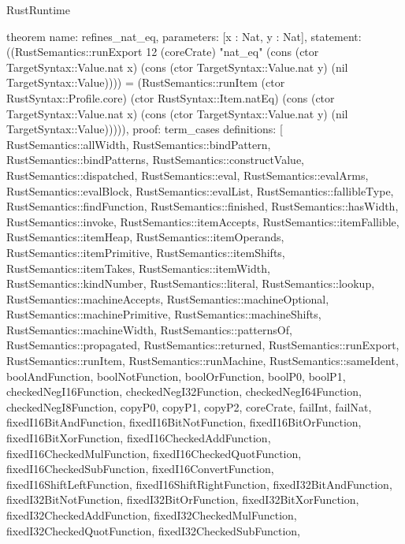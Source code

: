 \begin{lexlean}{RustRuntime}
\begin{semanticmodule}
theorem{
  name: refines_nat_eq,
  parameters: [x : Nat, y : Nat],
  statement: ((RustSemantics::runExport 12 (coreCrate) "nat_eq" (cons (ctor TargetSyntax::Value.nat x) (cons (ctor TargetSyntax::Value.nat y) (nil TargetSyntax::Value)))) = (RustSemantics::runItem (ctor RustSyntax::Profile.core) (ctor RustSyntax::Item.natEq) (cons (ctor TargetSyntax::Value.nat x) (cons (ctor TargetSyntax::Value.nat y) (nil TargetSyntax::Value))))),
  proof: term_cases{
    definitions: [
      RustSemantics::allWidth,
      RustSemantics::bindPattern,
      RustSemantics::bindPatterns,
      RustSemantics::constructValue,
      RustSemantics::dispatched,
      RustSemantics::eval,
      RustSemantics::evalArms,
      RustSemantics::evalBlock,
      RustSemantics::evalList,
      RustSemantics::fallibleType,
      RustSemantics::findFunction,
      RustSemantics::finished,
      RustSemantics::hasWidth,
      RustSemantics::invoke,
      RustSemantics::itemAccepts,
      RustSemantics::itemFallible,
      RustSemantics::itemHeap,
      RustSemantics::itemOperands,
      RustSemantics::itemPrimitive,
      RustSemantics::itemShifts,
      RustSemantics::itemTakes,
      RustSemantics::itemWidth,
      RustSemantics::kindNumber,
      RustSemantics::literal,
      RustSemantics::lookup,
      RustSemantics::machineAccepts,
      RustSemantics::machineOptional,
      RustSemantics::machinePrimitive,
      RustSemantics::machineShifts,
      RustSemantics::machineWidth,
      RustSemantics::patternsOf,
      RustSemantics::propagated,
      RustSemantics::returned,
      RustSemantics::runExport,
      RustSemantics::runItem,
      RustSemantics::runMachine,
      RustSemantics::sameIdent,
      boolAndFunction,
      boolNotFunction,
      boolOrFunction,
      boolP0,
      boolP1,
      checkedNegI16Function,
      checkedNegI32Function,
      checkedNegI64Function,
      checkedNegI8Function,
      copyP0,
      copyP1,
      copyP2,
      coreCrate,
      failInt,
      failNat,
      fixedI16BitAndFunction,
      fixedI16BitNotFunction,
      fixedI16BitOrFunction,
      fixedI16BitXorFunction,
      fixedI16CheckedAddFunction,
      fixedI16CheckedMulFunction,
      fixedI16CheckedQuotFunction,
      fixedI16CheckedSubFunction,
      fixedI16ConvertFunction,
      fixedI16ShiftLeftFunction,
      fixedI16ShiftRightFunction,
      fixedI32BitAndFunction,
      fixedI32BitNotFunction,
      fixedI32BitOrFunction,
      fixedI32BitXorFunction,
      fixedI32CheckedAddFunction,
      fixedI32CheckedMulFunction,
      fixedI32CheckedQuotFunction,
      fixedI32CheckedSubFunction,
}}
\end{semanticmodule}
\end{lexlean}
